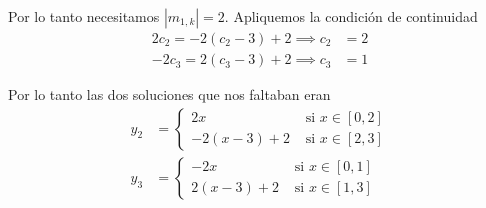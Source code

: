 \documentclass[a4paper,oneside,10.5pt]{USMArt}
\begin{document}
\begin{sol}
  Por lo tanto necesitamos $|m_{1,k}| = 2$. Apliquemos la condición de continuidad
  \begin{align*}
    2c_{2} = -2(c_{2} - 3) + 2 \implies c_{2} &= 2\\
    -2c_{3} = 2(c_{3} - 3) + 2 \implies c_{3} &= 1
  \end{align*}


  Por lo tanto las dos soluciones que nos faltaban eran
  \begin{align*}
    y_{2} &= \begin{cases}
      2x & \text{ si } x \in [0, 2]\\
      -2(x - 3) + 2 & \text{ si } x \in [2, 3]
    \end{cases}\\
    y_{3} &= \begin{cases}
      -2x & \text{ si } x \in [0, 1]\\
      2(x - 3) + 2 & \text{ si } x \in [1, 3]
    \end{cases}
  \end{align*}
\end{sol}
\end{document}
